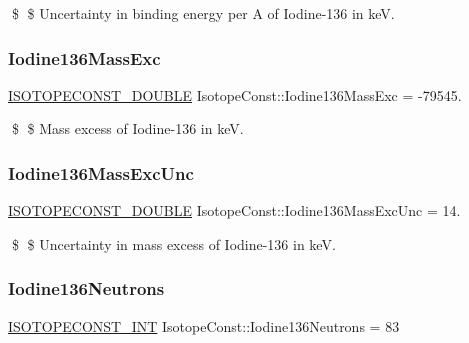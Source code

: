 \$ \$ Uncertainty in binding energy per A of Iodine-\/136 in keV. \mbox{\label{group___isotope_const-_iodine-_i136_ga6297d392ffa6f41be1771e369709e551}} 
\subsubsection{\texorpdfstring{Iodine136\+Mass\+Exc}{Iodine136MassExc}}
{\footnotesize\ttfamily \mbox{\hyperlink{group___isotope_const-_macros_ga8f45a7272ce02c0b4c65c44636ed719a}{I\+S\+O\+T\+O\+P\+E\+C\+O\+N\+S\+T\+\_\+\+D\+O\+U\+B\+LE}} Isotope\+Const\+::\+Iodine136\+Mass\+Exc = -\/79545.}

\$ \$ Mass excess of Iodine-\/136 in keV. \mbox{\label{group___isotope_const-_iodine-_i136_ga301d9da725e2fa49a3add2910e049424}} 
\subsubsection{\texorpdfstring{Iodine136\+Mass\+Exc\+Unc}{Iodine136MassExcUnc}}
{\footnotesize\ttfamily \mbox{\hyperlink{group___isotope_const-_macros_ga8f45a7272ce02c0b4c65c44636ed719a}{I\+S\+O\+T\+O\+P\+E\+C\+O\+N\+S\+T\+\_\+\+D\+O\+U\+B\+LE}} Isotope\+Const\+::\+Iodine136\+Mass\+Exc\+Unc = 14.}

\$ \$ Uncertainty in mass excess of Iodine-\/136 in keV. \mbox{\label{group___isotope_const-_iodine-_i136_ga8f78da96f36129e04dfcead9c6633e9c}} 
\subsubsection{\texorpdfstring{Iodine136\+Neutrons}{Iodine136Neutrons}}
{\footnotesize\ttfamily \mbox{\hyperlink{group___isotope_const-_macros_ga5f18360b3e99483a35c32d789e62621c}{I\+S\+O\+T\+O\+P\+E\+C\+O\+N\+S\+T\+\_\+\+I\+NT}} Isotope\+Const\+::\+Iodine136\+Neutrons = 83}

